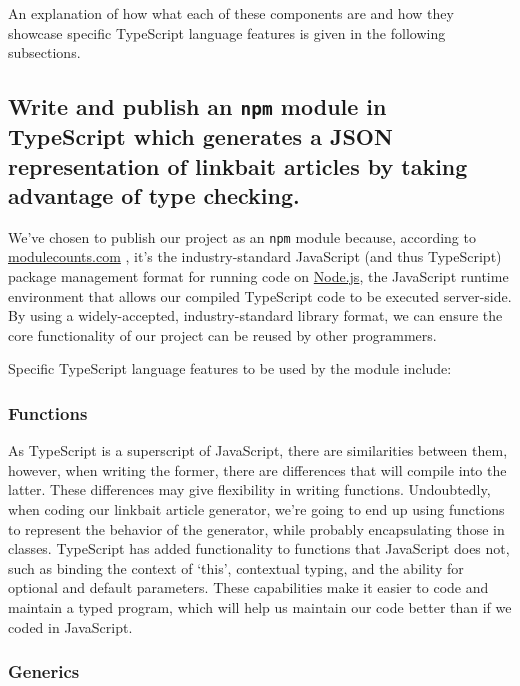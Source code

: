 \documentclass[]{article}
\begin{document}
An explanation of how what each of these components are and how they
showcase specific TypeScript language features is given in the following
subsections.

\subsection{Write and publish an \texttt{npm} module in TypeScript which
generates a JSON representation of linkbait articles by taking advantage
of type
checking.}\label{write-and-publish-an-npm-module-in-typescript-which-generates-a-json-representation-of-linkbait-articles-by-taking-advantage-of-type-checking.}

We've chosen to publish our project as an \texttt{npm} module because,
according to \href{http://www.modulecounts.com/}{modulecounts.com}
\cite{ref2}, it's the industry-standard JavaScript (and
thus TypeScript) package management format for running code on
\href{https://nodejs.org/en/}{Node.js}, the JavaScript runtime
environment that allows our compiled TypeScript code to be executed
server-side. By using a widely-accepted, industry-standard library
format, we can ensure the core functionality of our project can be
reused by other programmers.

Specific TypeScript language features to be used by the module include:

\subsubsection{Functions}\label{functions}

As TypeScript is a superscript of JavaScript, there are similarities
between them, however, when writing the former, there are differences
that will compile into the latter. These differences may give
flexibility in writing functions. Undoubtedly, when coding our linkbait
article generator, we're going to end up using functions to represent
the behavior of the generator, while probably encapsulating those in
classes. TypeScript has added functionality to functions that JavaScript
does not, such as binding the context of `this', contextual typing, and
the ability for optional and default parameters.
\cite{ref3}  These capabilities make it easier to code and
maintain a typed program, which will help us maintain our code better
than if we coded in JavaScript.

\subsubsection{Generics}\label{generics}
\end{document}
